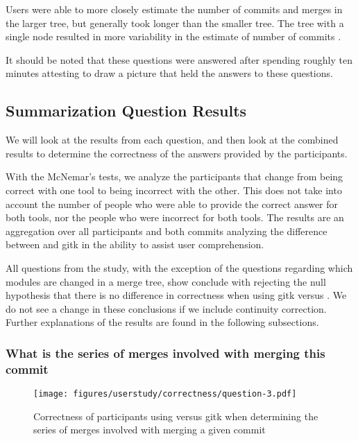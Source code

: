 Users were able to more closely estimate the number of commits and
merges in the larger tree, but generally took longer than the smaller
tree. The tree with a single node resulted in more variability in the
estimate of number of commits .

It should be noted that these questions were answered after spending
roughly ten minutes attesting to draw a picture that held the answers to
these questions.

\subsection{Summarization Question Results}

We will look at the results from each question, and then look at the
combined results to determine the correctness of the answers provided by
the participants.

With the McNemar's tests, we analyze the participants that change from
being correct with one tool to being incorrect with the other. This does
not take into account the number of people who were able to provide the
correct answer for both tools, nor the people who were incorrect for both
tools. The results are an aggregation over all participants and both
commits analyzing the difference between \tool and gitk in the ability
to assist user comprehension.

All questions from the study, with the exception of the questions
regarding which modules are changed in a merge tree, show conclude with
rejecting the null hypothesis that there is no difference in correctness
when using gitk versus \tool. We do not see a change in these
conclusions if we include continuity correction. Further explanations of
the results are found in the following subsections.

\subsubsection{What is the series of merges involved with merging this commit}
\label{ssub:what_is_the_series_of_merges_involved_with_merging_this_commit}

\begin{figure}[htpb]
  \centering
  \texttt{[image: figures/userstudy/correctness/question-3.pdf]}
  \caption{Correctness of participants using \tool versus gitk
    when determining the series of merges involved with merging a given
  commit}
  \label{fig:q_3_correctness}
\end{figure}

